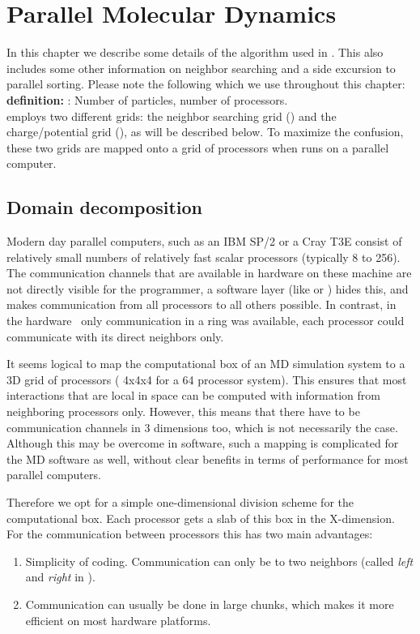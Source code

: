 \section{Parallel Molecular Dynamics}
In this chapter we describe some details of the   
algorithm used 
in {\gromacs}. This also includes some other information on neighbor searching and
a side excursion to parallel sorting.
Please note the following which we use throughout this chapter:\\
{\bf definition:} {\natom}: Number of particles, {\nproc} number of processors.\\
{\gromacs} employs two different grids: the neighbor searching grid ({\nsgrid})
and the charge/potential grid ({\fftgrid}), as will be described below.
To maximize the confusion, 
these two grids are mapped onto a grid of processors when {\gromacs} runs on a 
parallel computer.

\subsection{Domain decomposition}
Modern day parallel computers, such as an IBM SP/2 or a Cray T3E
consist of relatively small numbers of relatively fast scalar
processors (typically 8 to 256).  The communication channels that are
available in hardware on these machine are not directly visible for
the programmer, a software layer (like  or
) hides this, and makes communication from all processors to all
others possible. In contrast, in the {\gromacs} hardware~\cite{Berendsen95a}
only communication in a ring was available, {\ie} each processor could communicate
with its direct neighbors only.

It seems logical to map the computational box of an MD simulation system 
to a 3D grid of 
processors ({\eg} 4x4x4 for a 64 processor system). This ensures that most 
interactions that are local in space can be computed with information from 
neighboring processors only. However, this means that there have to be
communication channels in 3 dimensions too, which is not necessarily the case.
Although this may be overcome in software, such a mapping is complicated for the MD
software as well, without clear benefits in terms of performance for most
parallel computers. 

Therefore we opt for a simple one-dimensional division scheme
for the computational box. Each processor gets a slab of this box in the 
X-dimension.
For the communication between processors this has two main advantages:
\begin{enumerate}
\item	Simplicity of coding. Communication can only be to two neighbors
	(called {\em left} and {\em right} in {\gromacs}).
\item	Communication can usually be done in large chunks, which makes it
	more efficient on most hardware platforms.
\end{enumerate}


